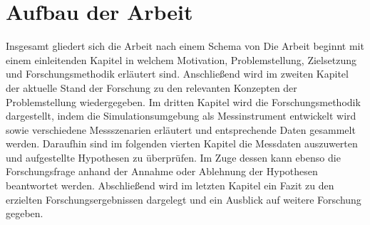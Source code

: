 \section{Aufbau der Arbeit}

Insgesamt gliedert sich die Arbeit nach einem Schema von \cite[]{Holzweiig.2022}
Die Arbeit beginnt mit einem einleitenden Kapitel in welchem Motivation, Problemstellung, Zielsetzung und Forschungsmethodik erläutert sind.
Anschließend wird im zweiten Kapitel der aktuelle Stand der Forschung zu den relevanten Konzepten der Problemstellung wiedergegeben.
Im dritten Kapitel wird die Forschungsmethodik dargestellt, indem die Simulationsumgebung als Messinstrument entwickelt wird sowie verschiedene Messszenarien erläutert und entsprechende Daten gesammelt werden. 
Daraufhin sind im folgenden vierten Kapitel die Messdaten auszuwerten und aufgestellte Hypothesen zu überprüfen.
Im Zuge dessen kann ebenso die Forschungsfrage anhand der Annahme oder Ablehnung der Hypothesen beantwortet werden.
Abschließend wird im letzten Kapitel ein Fazit zu den erzielten Forschungsergebnissen dargelegt und ein Ausblick auf weitere Forschung gegeben.
